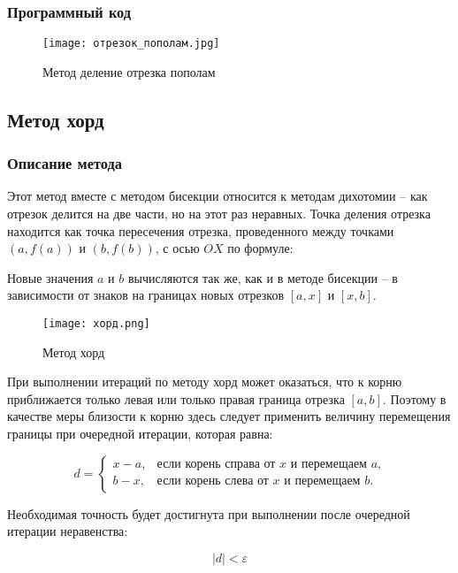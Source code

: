 \documentclass[a4paper,12pt]{article}
\begin{document}
\newpage

\subsubsection{Программный код}

\begin{figure}[h]
\centering
\texttt{[image: отрезок\_пополам.jpg]}
\caption{Метод деление отрезка пополам}
\label{fig:method_half_code}
\end{figure}

\subsection{Метод хорд}

\subsubsection{Описание метода}
Этот метод вместе с методом бисекции относится к методам дихотомии – как отрезок делится
на две части, но на этот раз неравных. Точка деления отрезка находится как точка пересечения
отрезка, проведенного между точками $(a, f(a))$ и $(b, f (b))$, с осью $OX$ по формуле:



Новые значения $a$ и $b$ вычисляются так же, как и в методе бисекции – в зависимости от знаков
на границах новых отрезков $[a, x]$ и $[x, b]$. 

\begin{figure}[h]
\centering
\texttt{[image: хорд.png]}
\caption{Метод хорд}
\label{fig:method_chord}
\end{figure}

При выполнении итераций по методу хорд может оказаться, что к корню приближается
только левая или только правая граница отрезка $[a, b]$. Поэтому в качестве меры близости к корню
здесь следует применить величину перемещения границы при очередной итерации, которая равна:

$$
        d=\begin{cases}
                 x - a, & \text{если корень справа от $x$ и перемещаем $a$,} \\
                 b - x, & \text{если корень слева от $x$ и перемещаем $b$.}
        \end{cases}
$$

Необходимая точность будет достигнута при выполнении после очередной итерации
неравенства:

$$|d| < \varepsilon $$
\end{document}
